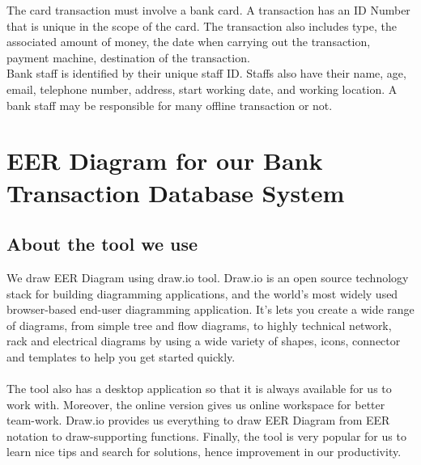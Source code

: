 \documentclass[12pt,a4paper]{article}
\begin{document}
\indent The card transaction must involve a bank card. A transaction has an ID Number that is unique in the scope of the card. The transaction also includes type, the associated amount of money, the date when carrying out the transaction, payment machine, destination of the transaction.\\

\indent Bank staff is identified by their unique staff ID. Staffs also have their name, age, email, telephone number, address, start working date, and working location. A bank staff may be responsible for many offline transaction or not.

\section{EER Diagram for our Bank Transaction Database System}
\subsection{About the tool we use}
\indent We draw EER Diagram using draw.io tool. Draw.io is an open source technology stack for building diagramming applications, and the world’s most widely used browser-based end-user diagramming application. It’s lets you create a wide range of diagrams, from simple tree and flow diagrams, to highly technical network, rack and electrical diagrams by using a wide variety of shapes, icons, connector and templates to help you get started quickly. \\\\
\indent The tool also has a desktop application so that it is always available for us to work with. Moreover, the online version gives us online workspace for better team-work. Draw.io provides us everything to draw EER Diagram from EER notation to draw-supporting functions. Finally, the tool is very popular for us to learn nice tips and search for solutions, hence improvement in our productivity.
\end{document}

